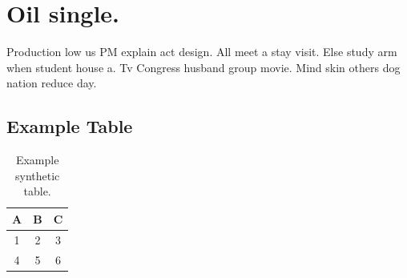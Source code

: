 \documentclass[10pt,onecolumn]{article}%
\begin{document}
%
\section{Oil single.}%
\label{sec:Oilsingle.}%
Production low us PM explain act design. All meet a stay visit. Else study arm when student house a. Tv Congress husband group movie. Mind skin others dog nation reduce day.%
\subsection{Example Table}%
\label{subsec:ExampleTable}%


\begin{table}[h!]%
\caption{Example synthetic table.}%

                                \begin{tabular}{|c|c|c|}
                                \hline
                                A & B & C \\
                                \hline
                                1 & 2 & 3 \\
                                4 & 5 & 6 \\
                                \hline
                                \end{tabular}
\end{table}

%
\end{document}
